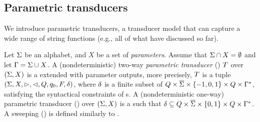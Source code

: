 

\subsection{Parametric transducers}

We introduce parametric transducers, a transducer model that can 
capture a wide range of string functions (e.g., all of what have discussed so far). 


\begin{definition}
    Let $\Sigma$ be an alphabet, and $X$ be a set of \emph{parameters}. 
    Assume that $\Sigma \cap X = \emptyset$  and let $\Gamma = \Sigma \cup X$. 
    A (nondeterministic) two-way \emph{parametric transducer} (\PPT)  $T$ over 
    $(\Sigma,X)$ is a  \FFT{}  extended with  parameter outputs, more precisely, $T$ is a tuple 
    $(\Sigma, X, \vartriangleright, \vartriangleleft, Q, q_0, F, \delta)$, where
 $\delta$ is a finite subset of $Q \times 
    \overline{\Sigma}\times \{-1, 0, 1\}\times 
    Q \times \Gamma^*$, satisfying the syntactical constraints of \FFT{}s.   
    A (nondeterministic one-way) parametric transducer (\PT) over
    $(\Sigma,X)$ is a \PPT{} such that
 $\delta\subseteq Q \times 
    \overline{\Sigma}\times \{0, 1\}\times 
    Q \times \Gamma^*$.   
    A sweeping \PPT{} (\SPPT) is defined similarly to \SFFT. 
\end{definition}

